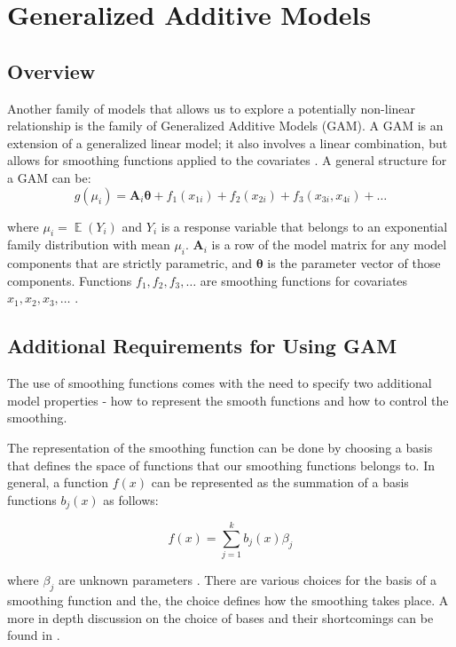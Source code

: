 \section{Generalized Additive Models}

\subsection{Overview}
Another family of models that allows us to explore a potentially non-linear relationship is the family of Generalized Additive Models (GAM). A GAM is an extension of a generalized linear model; it also involves a linear combination, but allows for smoothing functions applied to the covariates \citep{hastie2017generalized}. A general structure for a GAM can be: 
\setlength\abovedisplayskip{4pt}
\setlength\belowdisplayskip{4pt}
\begin{equation*}
g\left(\mu_{i}\right)=\mathbf{A}_{i} \boldsymbol{\theta}+f_{1}\left(x_{1 i}\right)+f_{2}\left(x_{2 i}\right)+f_{3}\left(x_{3 i}, x_{4 i}\right)+\ldots
\end{equation*}

where $\mu_{i} = \mathop{\mathbb{E}}(Y_i)$  and $Y_i$ is a response variable that belongs to an exponential family distribution with mean $\mu_{i}$. $\mathbf{A}_{i}$ is a row of the model matrix for any model components that are strictly parametric, and $\boldsymbol{\theta}$ is the parameter vector of those components. Functions $f_1, f_2, f_3, \ldots$ are smoothing functions for covariates $x_1, x_2, x_3, \ldots$  \citep{wood2017generalized}. 

\subsection{Additional Requirements for Using GAM}

The use of smoothing functions comes with the need to specify two additional model properties - how to represent the smooth functions and how to control the smoothing. 

The representation of the smoothing function can be done by choosing a basis that defines the space of functions that our smoothing functions belongs to. In general, a function $f(x)$ can be represented as the summation of a basis functions $b_{j}(x)$ as follows: 

$$
f(x)=\sum_{j=1}^{k} b_{j}(x) \beta_{j}
$$

where $\beta_{j}$ are unknown parameters  \citep{wood2017generalized}. There are various choices for the basis of a smoothing function and the, the choice defines how the smoothing takes place. A more in depth discussion on the choice of bases and their shortcomings can be found in . 

